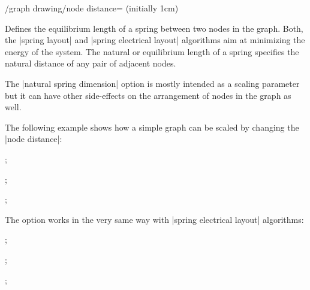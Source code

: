 \begin{key}{/graph drawing/node distance= (initially 1cm)}

  Defines the equilibrium length of a spring between two nodes in the
  graph. Both, the |spring layout| and |spring electrical layout|
  algorithms aim at minimizing the energy of the system. The
  natural or equilibrium length of a spring specifies the natural
  distance of any pair of adjacent nodes.

  The |natural spring dimension| option is mostly intended as a scaling
  parameter but it can have other side-effects on the arrangement of
  nodes in the graph as well.

  The following example shows how a simple graph can be scaled by
  changing the |node distance|:
  \begin{codeexample}[width=5cm]
\tikz {};

\tikz {};

\tikz {};
  \end{codeexample}

  The option works in the very same way with |spring electrical layout|
  algorithms:
  \begin{codeexample}[width=5cm]
\tikz {};

\tikz {};

\tikz {};
  \end{codeexample}
\end{key}




